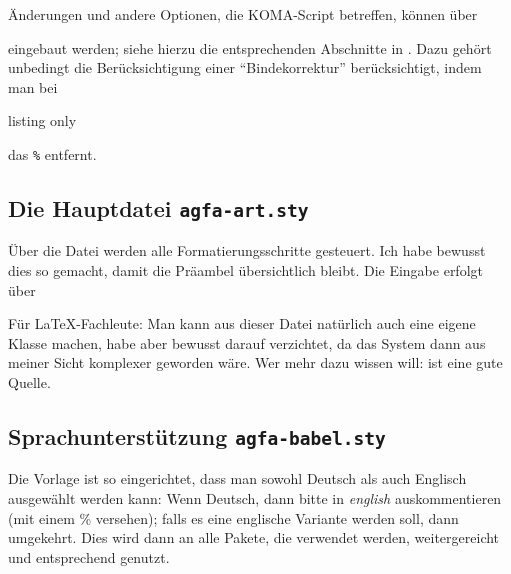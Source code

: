 Änderungen und andere Optionen, die KOMA-Script betreffen, können über 
%
\begin{center}
\end{center}
%
eingebaut werden; siehe hierzu die entsprechenden Abschnitte in \textcite{kohm:2020}.
Dazu gehört unbedingt die Berücksichtigung einer \enquote{Bindekorrektur} berücksichtigt, indem man bei 
%
\begin{tcblisting}{listing only}
\end{tcblisting}
%
das \texttt{\%} entfernt.

\subsection{Die Hauptdatei \texttt{agfa-art.sty}}\label{subsec:agfa-art}
%
Über die Datei  werden alle Formatierungsschritte gesteuert.
Ich habe bewusst dies so gemacht, damit die Präambel übersichtlich bleibt. 
Die Eingabe erfolgt über
%
\begin{tcolorbox}
\end{tcolorbox}
%
%
%
%
%
Für \LaTeX-Fachleute: Man kann aus dieser Datei natürlich auch eine eigene Klasse machen, habe aber bewusst darauf verzichtet, da das System dann aus meiner Sicht komplexer geworden wäre. 
Wer mehr dazu wissen will: \textcite{goossen:2005} ist eine gute Quelle.
%
\subsection{Sprachunterstützung \texttt{agfa-babel.sty}}\label{subsec:babel}
%
Die Vorlage ist so eingerichtet, dass man sowohl Deutsch als auch Englisch ausgewählt werden kann: Wenn Deutsch, dann bitte in \emph{english} auskommentieren (mit einem \% versehen); falls es eine englische Variante werden soll, dann umgekehrt.
Dies wird dann an alle Pakete, die verwendet werden, weitergereicht und entsprechend genutzt.

